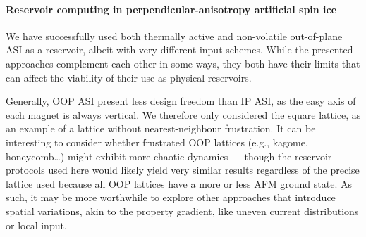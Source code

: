 \paragraph{Reservoir computing in perpendicular-anisotropy artificial spin ice}
We have successfully used both thermally active and non-volatile out-of-plane ASI as a reservoir, albeit with very different input schemes.
While the presented approaches complement each other in some ways, they both have their limits that can affect the viability of their use as physical reservoirs. \\\par

Generally, OOP ASI present less design freedom than IP ASI, as the easy axis of each magnet is always vertical.
We therefore only considered the square lattice, as an example of a lattice without nearest-neighbour frustration.
It can be interesting to consider whether frustrated OOP lattices (e.g., kagome, honeycomb\dots) might exhibit more chaotic dynamics --- though the reservoir protocols used here would likely yield very similar results regardless of the precise lattice used because all OOP lattices have a more or less AFM ground state.
As such, it may be more worthwhile to explore other approaches that introduce spatial variations, akin to the property gradient, like uneven current distributions or local input. \\\par

